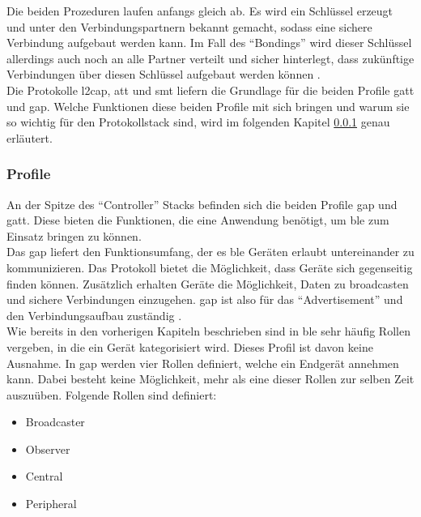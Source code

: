 \noindent Die beiden Prozeduren laufen anfangs gleich ab. Es wird ein Schlüssel erzeugt und unter den Verbindungspartnern bekannt gemacht, sodass eine sichere Verbindung aufgebaut werden kann. Im Fall des "`Bondings"' wird dieser Schlüssel allerdings auch noch an alle Partner verteilt und sicher hinterlegt, dass zukünftige Verbindungen über diesen Schlüssel aufgebaut werden können \cite[Seite 29]{Townsend14:GSB}.\\ 

\noindent Die Protokolle \ac{l2cap}, \ac{att} und \ac{smt} liefern die Grundlage für die beiden Profile \ac{gatt} und \ac{gap}. Welche Funktionen diese beiden Profile mit sich bringen und warum sie so wichtig für den Protokollstack sind, wird im folgenden Kapitel \ref{sss:funktionsweise:profiles} genau erläutert.\\

\subsubsection{Profile}
\label{sss:funktionsweise:profiles}

An der Spitze des "`Controller"' Stacks befinden sich die beiden Profile \ac{gap} und \ac{gatt}. Diese bieten die Funktionen, die eine Anwendung benötigt, um \ac{ble} zum Einsatz bringen zu können.\\

\noindent Das \ac{gap} liefert den Funktionsumfang, der es \ac{ble} Geräten erlaubt untereinander zu kommunizieren. Das Protokoll bietet die Möglichkeit, dass Geräte sich gegenseitig finden können. Zusätzlich erhalten Geräte die Möglichkeit, Daten zu broadcasten und sichere Verbindungen einzugehen. \ac{gap} ist also für das "`Advertisement"' und den Verbindungsaufbau zuständig \cite[Seite 33]{Townsend14:GSB}.\\

\noindent Wie bereits in den vorherigen Kapiteln beschrieben sind in \ac{ble} sehr häufig Rollen vergeben, in die ein Gerät kategorisiert wird. Dieses Profil ist davon keine Ausnahme. In \ac{gap} werden vier Rollen definiert, welche ein Endgerät annehmen kann. Dabei besteht keine Möglichkeit, mehr als eine dieser Rollen zur selben Zeit auszuüben. Folgende Rollen sind definiert:
\begin{itemize}
	\item{Broadcaster}
	\item{Observer}
	\item{Central}
	\item{Peripheral}
\end{itemize}     

